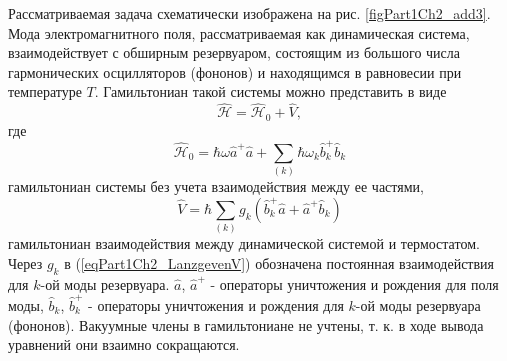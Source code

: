 Рассматриваемая задача схематически изображена на
рис. \ref{figPart1Ch2_add3}. Мода электромагнитного поля,
рассматриваемая как динамическая система, взаимодействует с обширным
резервуаром, состоящим из большого числа гармонических осцилляторов
(фононов) и находящимся в равновесии при температуре $T$. Гамильтониан
такой системы можно представить в виде
\begin{equation}
\hat{\mathcal{H}} = \hat{\mathcal{H}}_0 + \hat{V},
\nonumber
\end{equation}
где
\begin{equation}
 \hat{\mathcal{H}}_0 = \hbar\omega \hat{a}^{+}\hat{a} +
\sum_{(k)} \hbar\omega_k \hat{b}_k^{+} \hat{b}_k
\nonumber
\end{equation}
гамильтониан системы без учета взаимодействия между ее частями,
\begin{equation}
 \hat{V} = \hbar \sum_{(k)}g_k\left(
\hat{b}_k^{+}\hat{a} + \hat{a}^{+}\hat{b}_k
\right)
\label{eqPart1Ch2_LanzgevenV}
\end{equation}
гамильтониан взаимодействия между динамической системой и
термостатом. Через $g_k$ в (\ref{eqPart1Ch2_LanzgevenV}) обозначена
постоянная взаимодействия для $k$-ой моды резервуара. $\hat{a}$,
$\hat{a}^{+}$ - операторы уничтожения и рождения для поля моды,
$\hat{b}_k$, $\hat{b}_{k}^{+}$ - операторы уничтожения и рождения для
$k$-ой моды резервуара (фононов). Вакуумные члены в гамильтониане не
учтены, т. к. в ходе вывода уравнений они взаимно сокращаются.

